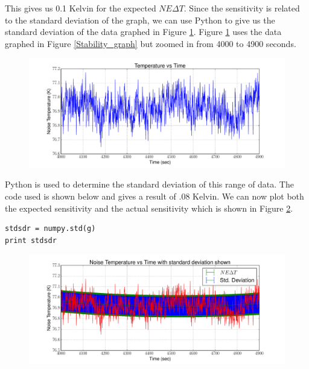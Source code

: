 This gives us 0.1 Kelvin for the expected $NE\Delta T$.  Since the sensitivity is related to the standard deviation of the graph, we can use Python to give us the standard deviation of the data graphed in Figure \ref{Sensitivity_graph}.  Figure \ref{Sensitivity_graph} uses the data graphed in Figure \ref{Stability_graph} but zoomed in from 4000 to 4900 seconds. 

\begin{figure}[h!tb] \centering
\includegraphics[width=\textwidth]{Experiments/Exp2/sdr_calibrated_zoom.pdf}
\label{Sensitivity_graph}
\end{figure}

Python is used to determine the standard deviation of this range of data.  The code used is shown below and gives a result of .08 Kelvin.  We can now plot both the expected sensitivity and the actual sensitivity which is shown in Figure \ref{sensitivity_exp_real}.

\begin{lstlisting}[frame=single,keywordstyle=\color{blue}]
stdsdr = numpy.std(g)
print stdsdr
\end{lstlisting}

\begin{figure}[h!tb] \centering
\includegraphics[width=\textwidth]{Experiments/Exp2/calib_vstime_stddev.pdf}
\label{sensitivity_exp_real}
\end{figure}
\ \\

